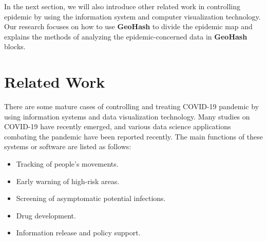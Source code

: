 \documentclass[conference]{IEEEtran}
\begin{document}
In the next section, we will also introduce other related work in controlling epidemic by using the information system and computer visualization technology.
Our research focuses on how to use \textbf{GeoHash} to divide the epidemic map and explains the methods of analyzing the epidemic-concerned data in \textbf{GeoHash} blocks.

\section{Related Work}
There are some mature cases of controlling and treating COVID-19 pandemic by using information systems and data visualization technology.
Many studies on COVID-19 have recently emerged, and various data science applications combating the pandemic have been reported recently\cite{latif2020leveraging}.
The main functions of these systems or software are listed as follows\cite{jia2020big}:
\begin{itemize}
    \item Tracking of people's movements.
    \item Early warning of high-risk areas.
    \item Screening of asymptomatic potential infections.
    \item Drug development.
    \item Information release and policy support.
\end{itemize}
\end{document}
